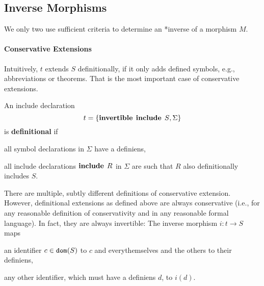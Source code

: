 \subsection{Inverse Morphisms}\label{sec:inverse}

We only two use sufficient criteria to determine an *inverse of a morphism $M$.

\paragraph{Conservative Extensions}
Intuitively, $t$ extends $S$ definitionally, if it only adds defined symbols, e.g., abbreviations or theorems.
That is the most important case of conservative extensions.

\begin{definition}
An include declaration \[t=\{\operatorname{\mathbf{invertible}}\;\operatorname{\mathbf{include}}{\;S},\Sigma\}\] is \textbf{definitional} if
\begin{compactitem}
 \item all symbol declarations in $\Sigma$ have a definiens,
 \item all include declarations $\operatorname{\mathbf{include}}{\;R}$ in $\Sigma$ are such that $R$ also definitionally includes $S$.
\end{compactitem}
\end{definition}

There are multiple, subtly different definitions of conservative extension.
However, definitional extensions as defined above are always conservative (i.e., for any reasonable definition of conservativity and in any reasonable formal language).
In fact, they are always invertible: The inverse morphism $i:t\to S$ maps
\begin{compactitem}
 \item an identifier $c\in\mathtt{dom}(S)$ to $c$ and everythemselves and the others to their definiens,
 \item any other identifier, which must have a definiens $d$, to $i(d)$.
\end{compactitem}

